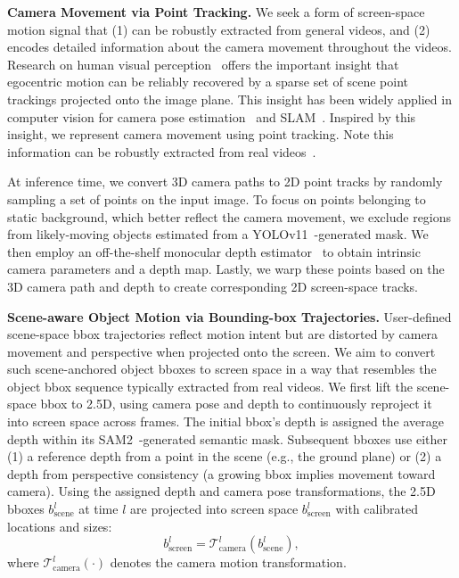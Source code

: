 \textbf{Camera Movement via Point Tracking.}
We seek a form of screen-space motion signal that (1) can be robustly extracted from general videos, and (2) encodes detailed information about the camera movement throughout the videos.
Research on human visual perception~\cite{epstein1995perception, thompson2011perception} offers the important insight that egocentric motion can be reliably recovered by a sparse set of scene point trackings projected onto the image plane. This insight has been widely applied in computer vision for camera pose estimation~\cite{hartley2003vision} and SLAM~\cite{taketomi2017visual}.
Inspired by this insight, we represent camera movement using point tracking. Note this information can be robustly extracted from real videos~\cite{cho2025local}. 

At inference time, we convert 3D camera paths to 2D point tracks by randomly sampling a set of points on the input image. To focus on points belonging to static background, which better reflect the camera movement, we exclude regions from likely-moving objects estimated from a YOLOv11~\cite{khanam2024yolov11}-generated mask. 
We then employ an off-the-shelf monocular depth estimator~\cite{wang2024moge} to obtain intrinsic camera parameters and a depth map. Lastly, we warp these points based on the 3D camera path and depth to create corresponding 2D screen-space tracks.

\textbf{Scene-aware Object Motion via Bounding-box Trajectories.}
User-defined scene-space bbox trajectories reflect motion intent but are distorted by camera movement and perspective when projected onto the screen. 
We aim to convert such scene-anchored object bboxes to screen space in a way that resembles the object bbox sequence typically extracted from real videos. 
We first lift the scene-space bbox to 2.5D, using camera pose and depth to continuously reproject it into screen space across frames. The initial bbox's depth is assigned the average depth within its SAM2~\cite{ravi2024sam}-generated semantic mask. Subsequent bboxes use either (1) a reference depth from a point in the scene (e.g., the ground plane) or (2) a depth from perspective consistency (a growing bbox implies movement toward camera).
Using the assigned depth and camera pose transformations, the 2.5D bboxes $b_\text{scene}^l$ at time $l$ are projected into screen space $b_\text{screen}^l$ with calibrated locations and sizes:
\begin{equation}
    b_\text{screen}^l = \mathcal{T}_\text{camera}^l(b_\text{scene}^l),
\end{equation}
where $\mathcal{T}_\text{camera}^l(\cdot)$ denotes the camera motion transformation.


